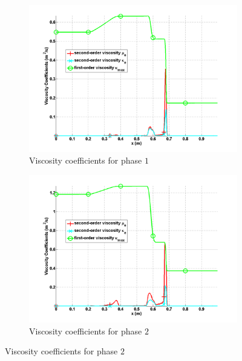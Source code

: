 \documentclass{anstrans}
\begin{document}
\begin{figure}[H]        
        \begin{subfigure}[b]{0.495\textwidth}
                \centering
                \includegraphics[width=\textwidth]{plots/relaxation_two_phases_liquid_viscosity_kappa_mu.png}
                \caption{Viscosity coefficients for phase $1$}
                \label{fig:viscosity_coeff_liq}
        \end{subfigure}        
				
        \begin{subfigure}[b]{0.495\textwidth}
                \centering
                \includegraphics[width=\textwidth]{plots/relaxation_two_phases_vapor_viscosity_kappa_mu.png}
                \caption{Viscosity coefficients for phase $2$}
                \label{fig:viscosity_coeff_vap}
        \end{subfigure}        
				

\end{figure}
\end{document}
